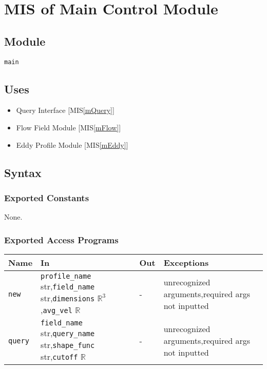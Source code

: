 \documentclass[12pt, titlepage]{article}
\begin{document}
\newpage
\section{MIS of Main Control Module} \label{mMain} 

\subsection{Module}
\texttt{main}

\subsection{Uses}
\begin{itemize}
\item Query Interface [MIS\ref{mQuery}]
\item Flow Field Module [MIS\ref{mFlow}]
\item Eddy Profile Module [MIS\ref{mEddy}]
\end{itemize}

\subsection{Syntax}

\subsubsection{Exported Constants}
None.

\subsubsection{Exported Access Programs}

\begin{center}
\begin{tabular}{p{2cm} p{3.5cm} p{3cm} p{5cm}}
\hline
\textbf{Name} & \textbf{In} & \textbf{Out} & \textbf{Exceptions} \\
\hline
\texttt{new}  & \texttt{profile\_name} str,\newline\texttt{field\_name} str,\newline\texttt{dimensions} $\mathbb{R}^3$,\newline\texttt{avg\_vel} $\mathbb{R}$ & - & unrecognized arguments,\newline required args not inputted\\
\texttt{query}  & \texttt{field\_name} str,\newline\texttt{query\_name} str,\newline\texttt{shape\_func} str,\newline\texttt{cutoff} $\mathbb{R}$ & - & unrecognized arguments,\newline required args not inputted\\
\hline
\end{tabular}
\end{center}
\end{document}
